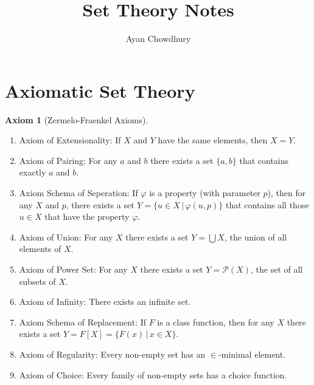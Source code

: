 \documentclass{article}
\title{Set Theory Notes}
\author{Ayan Chowdhury}
\date{}
\theoremstyle{definition}
\newtheorem{axm}[thm]{Axiom}
\newcommand{\powset}[1]{\mathcal{P}(#1)}
\begin{document}
\maketitle

\tableofcontents

\newpage

\section{Axiomatic Set Theory}

\begin{axm}[Zermelo-Fraenkel Axioms]
    \hfill
    \begin{enumerate}[I]
        \item Axiom of Extensionality: If $X$ and $Y$ have the same elements, then $X = Y$.

        \item Axiom of Pairing: For any $a$ and $b$ there exists a set $\{a, b\}$ that contains exactly $a$ and $b$.

        \item Axiom Schema of Seperation: If $\varphi$ is a property (with parameter $p$), then for any $X$ and $p$, there exists a set $Y = \{u \in X \, | \, \varphi(u, p)\}$ that contains all those $u \in X$ that have the property $\varphi$.
        
        \item Axiom of Union: For any $X$ there exists a set $Y = \bigcup X$, the union of all elements of $X$.

        \item Axiom of Power Set: For any $X$ there exists a set $Y = \powset{X}$, the set of all subsets of $X$.

        \item Axiom of Infinity: There exists an infinite set.

        \item Axiom Schema of Replacement: If $F$ is a class function, then for any $X$ there exists a set $Y = F[X] = \{F(x) \, | \, x \in X\}$.

        \item Axiom of Regularity: Every non-empty set has an $\in$-minimal element.

        \item Axiom of Choice: Every family of non-empty sets has a choice function.
    \end{enumerate}
\end{axm}
\end{document}
